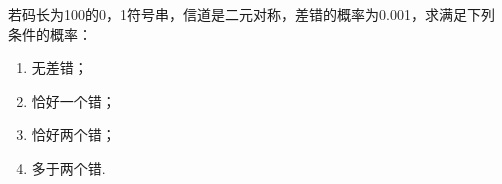 若码长为100的0，1符号串，信道是二元对称，差错的概率为0.001，求满足下列
条件的概率：
\begin{enumerate}
    \item 无差错；
    \item 恰好一个错；
    \item 恰好两个错；
    \item 多于两个错.
\end{enumerate}
